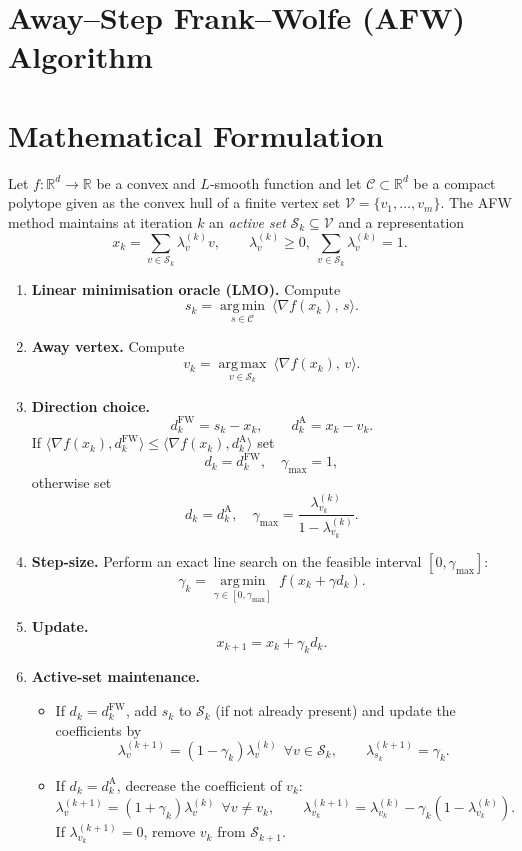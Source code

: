\documentclass{article}
\newcommand{\R}{\mathbb{R}}
\newcommand{\C}{\mathcal{C}}
\newcommand{\argmin}{\operatorname*{arg\,min}}
\newcommand{\argmax}{\operatorname*{arg\,max}}
\begin{document}
\section*{Away–Step Frank–Wolfe (AFW) Algorithm}

\section*{Mathematical Formulation}
Let $f:\R^{d}\rightarrow\R$ be a convex and $L$‑smooth function and let $\C\subset\R^{d}$ be a compact polytope given as the convex hull of a finite vertex set $\mathcal{V}=\{v_{1},\dots,v_{m}\}$.  
The AFW method maintains at iteration $k$ an \emph{active set} $\mathcal{S}_{k}\subseteq\mathcal{V}$ and a representation
\[
x_{k}= \sum_{v\in\mathcal{S}_{k}}\lambda^{(k)}_{v} v,\qquad 
\lambda^{(k)}_{v}\ge 0,\ \sum_{v\in\mathcal{S}_{k}}\lambda^{(k)}_{v}=1 .
\]

\begin{enumerate}[label=\textbf{Step \arabic*:}, leftmargin=*, itemsep=1ex]
\item \textbf{Linear minimisation oracle (LMO).} Compute
\[
s_{k}= \argmin_{s\in\C}\ \langle \nabla f(x_{k}),\, s\rangle .
\tag{1}
\]

\item \textbf{Away vertex.} Compute
\[
v_{k}= \argmax_{v\in\mathcal{S}_{k}}\ \langle \nabla f(x_{k}),\, v\rangle .
\tag{2}
\]

\item \textbf{Direction choice.}
\[
d^{\text{FW}}_{k}= s_{k}-x_{k},\qquad 
d^{\text{A}}_{k}= x_{k}-v_{k}.
\]
If $\langle \nabla f(x_{k}), d^{\text{FW}}_{k}\rangle\le \langle \nabla f(x_{k}), d^{\text{A}}_{k}\rangle$ set 
\[
d_{k}=d^{\text{FW}}_{k},\quad \gamma_{\max}=1,
\tag{3}
\]
otherwise set 
\[
d_{k}=d^{\text{A}}_{k},\quad 
\gamma_{\max}= \frac{\lambda^{(k)}_{v_{k}}}{1-\lambda^{(k)}_{v_{k}}}.
\tag{4}
\]

\item \textbf{Step‑size.} Perform an exact line search on the feasible interval $[0,\gamma_{\max}]$:
\[
\gamma_{k}= \argmin_{\gamma\in[0,\gamma_{\max}]}\ f(x_{k}+ \gamma d_{k}).
\tag{5}
\]

\item \textbf{Update.}
\[
x_{k+1}= x_{k}+ \gamma_{k} d_{k}.
\tag{6}
\]

\item \textbf{Active‑set maintenance.}
\begin{itemize}
\item If $d_{k}=d^{\text{FW}}_{k}$, add $s_{k}$ to $\mathcal{S}_{k}$ (if not already present) and update the coefficients by
\[
\lambda^{(k+1)}_{v}= (1-\gamma_{k})\lambda^{(k)}_{v}\ \ \forall v\in\mathcal{S}_{k},\qquad 
\lambda^{(k+1)}_{s_{k}}= \gamma_{k}.
\]
\item If $d_{k}=d^{\text{A}}_{k}$, decrease the coefficient of $v_{k}$:
\[
\lambda^{(k+1)}_{v}= (1+\gamma_{k})\lambda^{(k)}_{v}\ \ \forall v\neq v_{k},\qquad 
\lambda^{(k+1)}_{v_{k}}= \lambda^{(k)}_{v_{k}}-\gamma_{k}(1-\lambda^{(k)}_{v_{k}}).
\]
If $\lambda^{(k+1)}_{v_{k}}=0$, remove $v_{k}$ from $\mathcal{S}_{k+1}$.
\end{itemize}
\end{enumerate}
\end{document}
